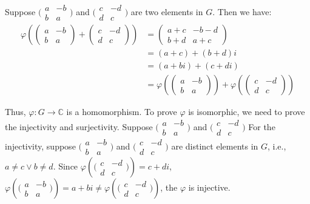\documentclass[12pt]{article}
\begin{document}
\section{} %
Suppose $\big(\begin{smallmatrix} a & -b\\b & a\end{smallmatrix}\big)$ and $\big(\begin{smallmatrix} c & -d\\d & c\end{smallmatrix}\big)$ are two elements in $G$. Then we have:
\begin{align*}
\varphi{(
\begin{pmatrix}a & -b\\b & a\end{pmatrix}+\begin{pmatrix}c & -d\\d & c\end{pmatrix})} &=\begin{pmatrix}a+c & -b-d\\b+d & a+c\end{pmatrix} \\
&= (a+c)+(b+d)i \\
&= (a+bi)+(c+di) \\
&= \varphi{(\begin{pmatrix}a & -b\\b & a\end{pmatrix})}+\varphi{(\begin{pmatrix}c & -d\\d & c\end{pmatrix})}
\end{align*}

Thus, $\varphi:G\rightarrow \mathbb{C}$ is a homomorphism. To prove $\varphi$ is isomorphic, we need to prove the injectivity and surjectivity.
Suppose $\big(\begin{smallmatrix} a & -b\\b & a\end{smallmatrix}\big)$ and $\big(\begin{smallmatrix} c & -d\\d & c\end{smallmatrix}\big)$
For the injectivity, suppose $\big(\begin{smallmatrix} a & -b\\b & a\end{smallmatrix}\big)$ and $\big(\begin{smallmatrix} c & -d\\d & c\end{smallmatrix}\big)$ are distinct elements in $G$, i.e., $a\ne c\vee b\ne d$. Since $\varphi(\big(\begin{smallmatrix} c & -d\\d & c\end{smallmatrix}\big))=c+di$, $\varphi(\big(\begin{smallmatrix} a & -b\\b & a\end{smallmatrix}\big))=a+bi\ne\varphi(\big(\begin{smallmatrix} c & -d\\d & c\end{smallmatrix}\big))$, the $\varphi$ is injective.
\end{document}
